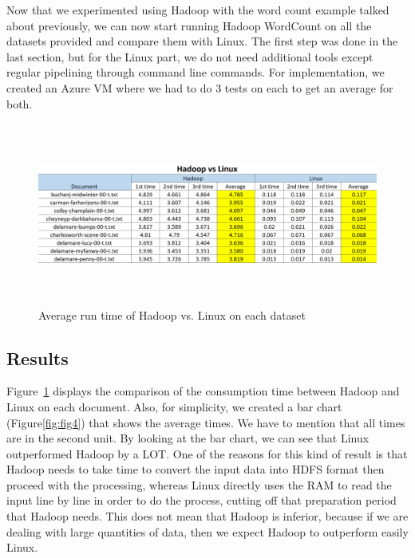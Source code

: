 \documentclass[12pt]{article}
\begin{document}
\noindent Now that we experimented using Hadoop with the word count example talked about previously, we can now start running Hadoop WordCount on all the datasets provided and compare them with Linux. The first step was done in the last section, but for the Linux part, we do not need additional tools except regular pipelining
through command line commands. For implementation, we created an Azure VM where we had to do 3 tests on each to get an average for both.

\begin{figure}[H]
    \centering
    \includegraphics[width=140mm, height=60mm, scale=1.0]{images/Hadoop_vs_Linux_table.PNG}
    \caption{Average run time of Hadoop vs. Linux on each dataset}
    \label{fig:fig3}
\end{figure}

\newpage

\subsection{Results}

\noindent Figure~\ref{fig:fig3} displays the comparison of the consumption time between Hadoop and Linux on each document. Also, for simplicity, we created a bar chart (Figure\ref{fig:fig4}) that shows the average times. We have to mention that all times are in the second unit. By looking at the bar chart, we can see that Linux outperformed Hadoop by a LOT. One of the reasons for this kind of result is that Hadoop needs to take time to convert the input data into HDFS format then proceed with the processing, whereas Linux directly uses the RAM to read the input line by line in order to do the process, cutting off that preparation period that Hadoop needs. This does not mean that Hadoop is inferior, because if we are dealing with large quantities of data, then we expect Hadoop to outperform easily Linux.
\end{document}
